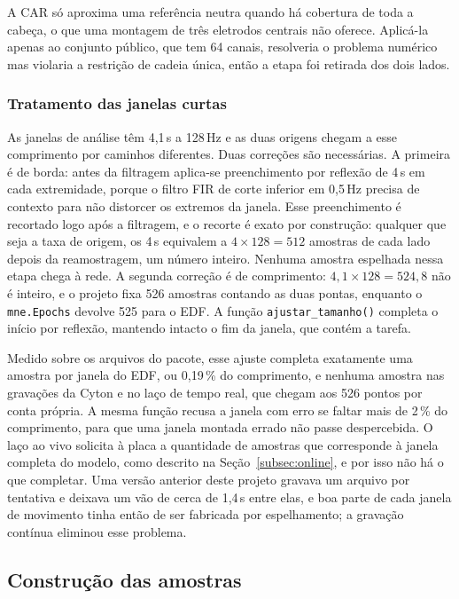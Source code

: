 \documentclass[12pt,a4paper]{article}
\begin{document}
A CAR só aproxima uma referência neutra quando há cobertura de toda a cabeça, o que uma
montagem de três eletrodos centrais não oferece. Aplicá-la apenas ao conjunto público, que
tem 64 canais, resolveria o problema numérico mas violaria a restrição de cadeia única, então
a etapa foi retirada dos dois lados.

\subsubsection{Tratamento das janelas curtas}\label{subsubsec:janelas}

As janelas de análise têm 4,1\,s a 128\,Hz e as duas origens chegam a esse comprimento por
caminhos diferentes. Duas correções são necessárias. A primeira é de borda: antes da
filtragem aplica-se preenchimento por reflexão de 4\,s em cada extremidade, porque o filtro
FIR de corte inferior em 0,5\,Hz precisa de contexto para não distorcer os extremos da
janela. Esse preenchimento é recortado logo após a filtragem, e o recorte é exato por
construção: qualquer que seja a taxa de origem, os 4\,s equivalem a
$4 \times 128 = 512$ amostras de cada lado depois da reamostragem, um número inteiro. Nenhuma
amostra espelhada nessa etapa chega à rede. A segunda correção é de comprimento:
$4{,}1 \times 128 = 524{,}8$ não é inteiro, e o projeto fixa 526 amostras contando as duas
pontas, enquanto o \texttt{mne.Epochs} devolve 525 para o EDF. A função
\texttt{ajustar\_tamanho()} completa o início por reflexão, mantendo intacto o fim da janela,
que contém a tarefa.

Medido sobre os arquivos do pacote, esse ajuste completa exatamente uma amostra por janela do
EDF, ou 0,19\,\% do comprimento, e nenhuma amostra nas gravações da Cyton e no laço de tempo
real, que chegam aos 526 pontos por conta própria. A mesma função recusa a janela com erro se
faltar mais de 2\,\% do comprimento, para que uma janela montada errado não passe
despercebida. O laço ao vivo solicita à placa a quantidade de amostras que corresponde à
janela completa do modelo, como descrito na Seção~\ref{subsec:online}, e por isso não há o
que completar. Uma versão anterior deste projeto gravava um arquivo por tentativa e deixava um
vão de cerca de 1,4\,s entre elas, e boa parte de cada janela de movimento tinha então de ser
fabricada por espelhamento; a gravação contínua eliminou esse problema.

\subsection{Construção das amostras}
\end{document}
